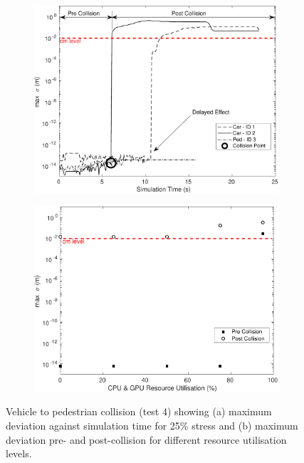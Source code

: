 \documentclass[letterpaper, 10 pt, journal, twoside]{IEEEtran}
\begin{document}
\begin{figure}[h]
    \centering
    \begin{subfigure}{.49\textwidth}
        \includegraphics[width=1\textwidth]{Other/Figures/CarsPeopleCollsionsCG25_V3.pdf}
        \caption{}
        \label{CarsPeopleCollsionsCG25}
    \end{subfigure}
    \begin{subfigure}{.49\textwidth}
        \includegraphics[width=1\textwidth]{Other/Figures/CarsPeopleCollisionPrePostV3.pdf}
        \caption{}
        \label{CarsPeopleCollisionPrePost}
    \end{subfigure}
    \caption{Vehicle to pedestrian collision (test 4) showing (a) maximum deviation against simulation time for 25\% stress and (b) maximum deviation pre- and post-collision for different resource utilisation levels.}
\end{figure}
\end{document}
